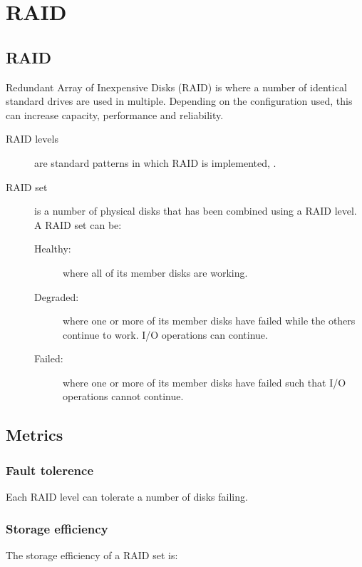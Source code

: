 \chapter{RAID}
\label{ch:raid}

\section{RAID}
\label{sec:raid}

Redundant Array of Inexpensive Disks (RAID) is where a number of
identical standard drives are used in multiple. Depending on the
configuration used, this can increase capacity, performance and
reliability.

\begin{description}
\item[RAID levels]
are standard patterns in which RAID is implemented, .
\item[RAID set]
is a number of physical disks that has been combined using a RAID level.
A RAID set can be:

\begin{description}
\item[Healthy:]
where all of its member disks are working.
\item[Degraded:]
where one or more of its member disks have failed while the others
continue to work. I/O operations can continue.
\item[Failed:]
where one or more of its member disks have failed such that I/O
operations cannot continue.
\end{description}
\end{description}

\section{Metrics}\label{metrics}

\subsection{Fault tolerence}\label{fault-tolerence}

Each RAID level can tolerate a number of disks failing.

\subsection{Storage efficiency}\label{storage-efficiency}

The storage efficiency of a RAID set is:

